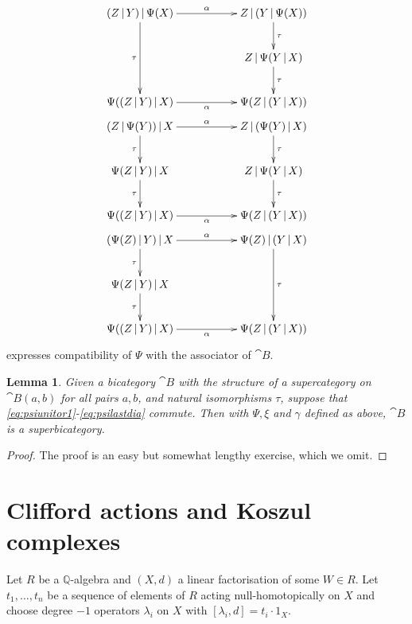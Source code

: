 \documentclass[english,letter paper,12pt,leqno]{article}
\newtheorem{lemma}[theorem]{Lemma}
\theoremstyle{example}
\numberwithin{equation}{section}
\begin{document}
\begin{gather}
\xymatrix{
(Z \l Y) \l \Psi(X) \ar[dd]_-{\tau} \ar[rr]^-{\alpha} & & Z \l ( Y \l \Psi(X)) \ar[d]^-{\tau}\\
 & & Z \l \Psi( Y \l X ) \ar[d]^-{\tau}\\
\Psi( (Z \l Y) \l X ) \ar[rr]_-{\alpha} & & \Psi( Z \l ( Y \l X ) )
} \label{eq:psithirdlastdia}\\
\xymatrix{
(Z \l \Psi(Y)) \l X \ar[d]_-{\tau} \ar[rr]^-{\alpha} & & Z \l ( \Psi(Y) \l X) \ar[d]^-{\tau}\\
\Psi( Z \l Y ) \l X \ar[d]_-{\tau} & & Z \l \Psi( Y \l X ) \ar[d]^-{\tau}\\
\Psi( (Z \l Y) \l X ) \ar[rr]_-{\alpha} & & \Psi( Z \l ( Y \l X ) )
} \label{eq:psimiddledia}\\
\xymatrix{
(\Psi(Z) \l Y) \l X \ar[d]_-{\tau} \ar[rr]^-{\alpha} & & \Psi(Z) \l ( Y \l X ) \ar[dd]^-{\tau}\\
\Psi(Z \l Y) \l X \ar[d]_-{\tau} & & \\
\Psi( (Z \l Y) \l X ) \ar[rr]_-{\alpha} & & \Psi( Z \l ( Y \l X ) )
}\label{eq:psilastdia}
\end{gather}
expresses compatibility of $\Psi$ with the associator of $\cat{B}$.

\begin{lemma}\label{lemma:constructingsuper}
Given a bicategory $\cat{B}$ with the structure of a supercategory on $\cat{B}(a,b)$ for all pairs $a,b$, and natural isomorphisms $\tau$, suppose that \eqref{eq:psiunitor1}-\eqref{eq:psilastdia} commute. Then with $\Psi, \xi$ and $\gamma$ defined as above, $\cat{B}$ is a superbicategory.
\end{lemma}
\begin{proof}
The proof is an easy but somewhat lengthy exercise, which we omit.
\end{proof}

\section{Clifford actions and Koszul complexes}\label{section:cliffordactkos}

Let $R$ be a $\mathbb{Q}$-algebra and $(X,d)$ a linear factorisation of some $W \in R$. Let $t_1,\ldots,t_n$ be a sequence of elements of $R$ acting null-homotopically on $X$ and choose degree $-1$ operators $\lambda_i$ on $X$ with $[\lambda_i, d] = t_i \cdot 1_X$.
\end{document}
